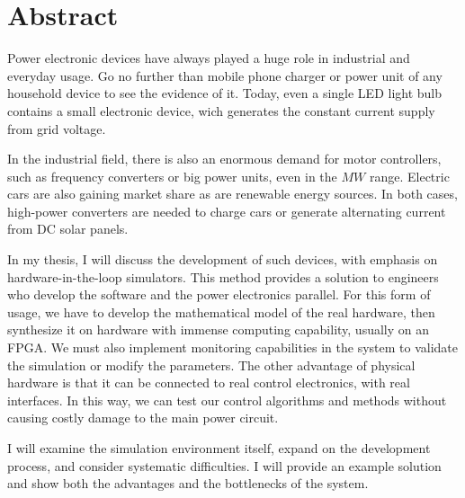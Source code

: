 \chapter*{Abstract}

Power electronic devices have always played a huge role in industrial and everyday usage. Go no further than mobile phone charger or power unit of any household device to see the evidence of it. Today, even a single LED light bulb contains a small electronic device, wich generates the constant current supply from grid voltage.
 
In the industrial field, there is also an enormous demand for motor controllers, such as frequency converters or big power units, even in the $MW$ range. Electric cars are also gaining market share as are renewable energy sources. In both cases, high-power converters are needed to charge cars or generate alternating current from DC solar panels.
 
In my thesis, I will discuss the development of such devices, with emphasis on hardware-in-the-loop simulators. This method provides a solution to engineers who develop the software and the power electronics parallel. For this form of usage, we have to develop the mathematical model of the real hardware, then synthesize it on hardware with immense computing capability, usually on an FPGA. We must also implement monitoring capabilities in the system to validate the simulation or modify the parameters. The other advantage of physical hardware is that it can be connected to real control electronics, with real interfaces. In this way, we can test our control algorithms and methods without causing costly damage to the main power circuit. 
 
I will examine the simulation environment itself, expand on the development process, and consider systematic difficulties. I will provide an example solution and show both the advantages and the bottlenecks of the system.


\vfill
\selectthesislanguage

\setcounter{romanPage}{\value{page}}
